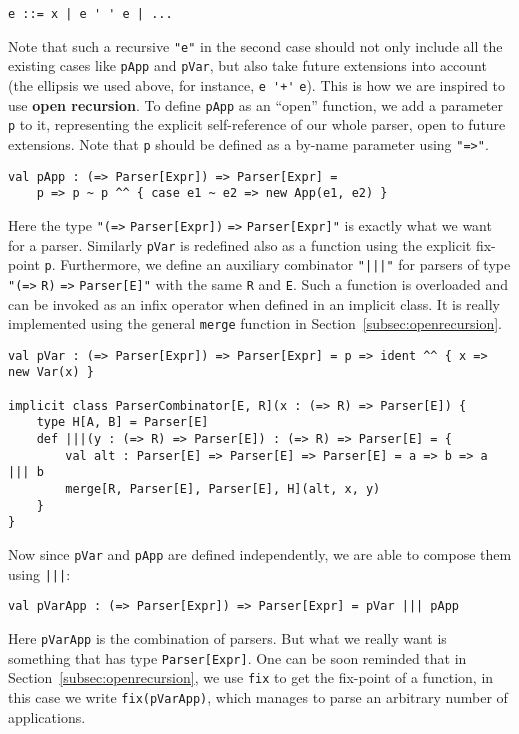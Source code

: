 \begin{lstlisting}
e ::= x | e ' ' e | ...
\end{lstlisting}
Note that such a recursive \lstinline{"e"} in the second case should not only include all the existing cases like \lstinline{pApp} and \lstinline{pVar}, but also take future extensions into account (the ellipsis we used above, for instance, \lstinline{e '+'} \lstinline{e}). This is how we are inspired to use \textbf{open recursion}. To define \lstinline{pApp} as an ``open'' function, we add a parameter \lstinline{p} to it, representing the explicit self-reference of our whole parser, open to future extensions. Note that \lstinline{p} should be defined as a by-name parameter using \lstinline{"=>"}.
\begin{lstlisting}
val pApp : (=> Parser[Expr]) => Parser[Expr] =
    p => p ~ p ^^ { case e1 ~ e2 => new App(e1, e2) }
\end{lstlisting}
Here the type \lstinline{"(=>} \lstinline{Parser[Expr])} \lstinline{=>} \lstinline{Parser[Expr]"} is exactly what we want for a parser. Similarly \lstinline{pVar} is redefined also as a function using the explicit fix-point \lstinline{p}. Furthermore, we define an auxiliary combinator \lstinline{"|||"} for parsers of type \lstinline{"(=>} \lstinline{R)} \lstinline{=>} \lstinline{Parser[E]"} with the same \lstinline{R} and \lstinline{E}. Such a function is overloaded and can be invoked as an infix operator when defined in an implicit class. It is really implemented using the general \lstinline{merge} function in Section~\ref{subsec:openrecursion}.
 \begin{lstlisting}
val pVar : (=> Parser[Expr]) => Parser[Expr] = p => ident ^^ { x => new Var(x) }

implicit class ParserCombinator[E, R](x : (=> R) => Parser[E]) {
    type H[A, B] = Parser[E]
    def |||(y : (=> R) => Parser[E]) : (=> R) => Parser[E] = {
        val alt : Parser[E] => Parser[E] => Parser[E] = a => b => a ||| b
        merge[R, Parser[E], Parser[E], H](alt, x, y)
    }
}
\end{lstlisting}
Now since \lstinline{pVar} and \lstinline{pApp} are defined independently, we are able to compose them using \lstinline{|||}:
\begin{lstlisting}
val pVarApp : (=> Parser[Expr]) => Parser[Expr] = pVar ||| pApp
\end{lstlisting}
Here \lstinline{pVarApp} is the combination of parsers. But what we really want is something that has type \lstinline{Parser[Expr]}. One can be soon reminded that in Section~\ref{subsec:openrecursion}, we use \lstinline{fix} to get the fix-point of a function, in this case we write \lstinline{fix(pVarApp)}, which manages to parse an arbitrary number of applications.

